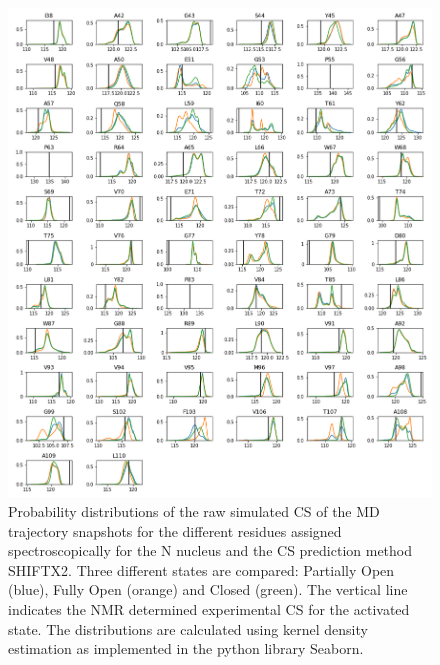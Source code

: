 \documentclass[%
 aip,
 amsmath,amssymb,
 preprint,%
]{revtex4-1}
\begin{document}
\begin{figure}[tbp]
	\includegraphics[width=\textwidth]{figures_SI/hist_shiftx2_N.png}
	 \caption{\scriptsize
 Probability distributions of the raw simulated CS of the MD trajectory snapshots for the different residues assigned spectroscopically for the N nucleus and the CS prediction method SHIFTX2. Three different states are compared: Partially Open (blue), Fully Open (orange) and Closed (green). The vertical line indicates the NMR determined experimental CS for the activated state. The distributions are calculated using kernel density estimation as implemented in the python library Seaborn. 
}
\label{SI_hist4}
\end{figure}
\end{document}
